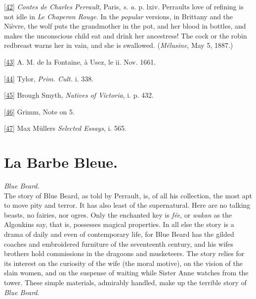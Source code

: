 \documentclass[14pt,a4paper]{memoir}
\begin{document}
\protect\hypertarget{4533318093929944247_33931-h-0.htm.xhtmlux5cux23Footnote_42}{}{}\protect\hyperlink{4533318093929944247_33931-h-0.htm.xhtmlux5cux23FNanchor_42}{{{[}42{]}}}
\emph{Contes de Charles Perrault}, Paris, \emph{s. a.} p. lxiv.
Perrault\textquotesingle s love of refining is not idle in \emph{Le
Chaperon Rouge}. In the \emph{popular} versions, in Brittany and the
Nièvre, the wolf puts the grandmother in the pot, and her blood in
bottles, and makes the unconscious child eat and drink her ancestress!
The cock or the robin redbreast warns her in vain, and she is swallowed.
(\emph{Mélusine}, May 5, 1887.)

\protect\hypertarget{4533318093929944247_33931-h-0.htm.xhtmlux5cux23Footnote_43}{}{}\protect\hyperlink{4533318093929944247_33931-h-0.htm.xhtmlux5cux23FNanchor_43}{{{[}43{]}}}
A. M. de la Fontaine, à Usez, le ii. Nov. 1661.

\protect\hypertarget{4533318093929944247_33931-h-0.htm.xhtmlux5cux23Footnote_44}{}{}\protect\hyperlink{4533318093929944247_33931-h-0.htm.xhtmlux5cux23FNanchor_44}{{{[}44{]}}}
Tylor, \emph{Prim. Cult.} i. 338.

\protect\hypertarget{4533318093929944247_33931-h-0.htm.xhtmlux5cux23Footnote_45}{}{}\protect\hyperlink{4533318093929944247_33931-h-0.htm.xhtmlux5cux23FNanchor_45}{{{[}45{]}}}
Brough Smyth, \emph{Natives of Victoria}, i. p. 432.

\protect\hypertarget{4533318093929944247_33931-h-0.htm.xhtmlux5cux23Footnote_46}{}{}\protect\hyperlink{4533318093929944247_33931-h-0.htm.xhtmlux5cux23FNanchor_46}{{{[}46{]}}}
Grimm, Note on 5.

\protect\hypertarget{4533318093929944247_33931-h-0.htm.xhtmlux5cux23Footnote_47}{}{}\protect\hyperlink{4533318093929944247_33931-h-0.htm.xhtmlux5cux23FNanchor_47}{{{[}47{]}}}
Max Müller\textquotesingle s \emph{Selected Essays}, i. 565.

\section{La Barbe Bleue.}

\emph{Blue Beard.} \\

The story of Blue Beard, as told by Perrault, is, of all his collection,
the most apt to move pity and terror. It has also least of the
supernatural. Here are no talking beasts, no fairies, nor ogres. Only
the enchanted key is \emph{fée}, or \emph{wakan} as the Algonkins say,
that is, possesses magical properties. In all else the story is a drama
of daily and even of contemporary life, for Blue Beard has the gilded
coaches and embroidered furniture of the seventeenth century, and his
wife\textquotesingle s brothers hold commissions in the dragoons and
musketeers. The story relies for its interest on the curiosity of the
wife (the moral motive), on the vision of the slain women, and on the
suspense of waiting while Sister Anne watches from the tower. These
simple materials, admirably handled, make up the terrible story of
\emph{Blue Beard}.
\end{document}
